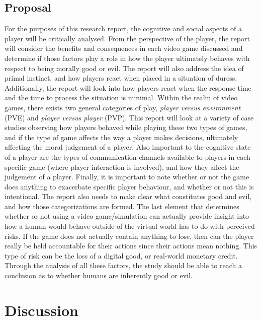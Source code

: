 \documentclass[12pt]{report}
\begin{document}
\section{Proposal}
For the purposes of this research report, the cognitive and social aspects of a player will be critically analysed. From the perspective of the player, the report will consider the benefits and consequences in each video game discussed and determine if those factors play a role in how the player ultimately behaves with respect to being morally good or evil. The report will also address the idea of primal instinct, and how players react when placed in a situation of duress. Additionally, the report will look into how players react when the response time and the time to process the situation is minimal. Within the realm of video games, there exists two general categories of play, \textit{player versus environment} (PVE) and \textit{player versus player} (PVP). This report will look at a variety of case studies observing how players behaved while playing these two types of games, and if the type of game affects the way a player makes decisions, ultimately affecting the moral judgement of a player. Also important to the cognitive state of a player are the types of communication channels available to players in each specific game (where player interaction is involved), and how they affect the judgement of a player. Finally, it is important to note whether or not the game does anything to exacerbate specific player behaviour, and whether or not this is intentional. The report also needs to make clear what constitutes good and evil, and how those categorizations are formed. The last element that determines whether or not using a video game/simulation can actually provide insight into how a human would behave outside of the virtual world has to do with perceived risks. If the game does not actually contain anything to lose, then can the player really be held accountable for their actions since their actions mean nothing. This type of risk can be the loss of a digital good, or real-world monetary credit. Through the analysis of all these factors, the study should be able to reach a conclusion as to whether humans are inherently good or evil.

\chapter{Discussion}
\end{document}

